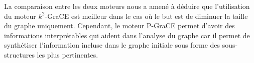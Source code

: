 	La comparaison entre les deux moteurs nous a amené à déduire que l'utilisation du moteur $k^2$-GraCE est meilleur dans le cas où le but est de diminuer la taille du graphe uniquement. Cependant, le moteur P-GraCE permet d'avoir des informations interprétables qui aident dans l'analyse du graphe car il permet de synthétiser l'information incluse dans le graphe initiale sous forme des sous-structures les plus pertinentes.
	
	
	
	
	
	
	
	
	
	
	
	
	
	
	
	
	
	
	
	
	
	
	
	
	
	
	